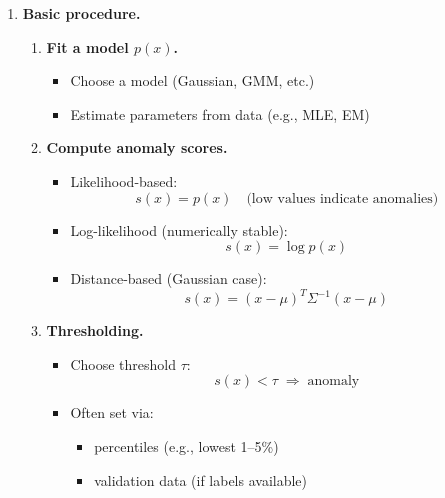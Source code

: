 \documentclass{article}
\begin{document}
\begin{enumerate}
\begin{itemize}
\begin{itemize}
\begin{itemize}
    \item Likelihood measures how well a model explains the data: for parameters $\theta$,
    \[
    L(\theta) = \prod_{i=1}^n p(x_i \mid \theta)
    \]

    \item Log-likelihood: same maximum as likelihood
    \[
    \ell(\theta) = \log L(\theta) = \sum_{i=1}^n \log p(x_i \mid \theta)
    \]

\end{itemize}

    \item \textbf{Key intuition:}
    \begin{itemize}
        \item E-step: assign points to clusters (softly)
        \item M-step: refit clusters using those assignments
    \end{itemize}
\end{itemize}
\end{itemize}

\item \textbf{Basic procedure.}

\begin{enumerate}
    \item \textbf{Fit a model \( p(x) \).}
    \begin{itemize}
        \item Choose a model (Gaussian, GMM, etc.)
        \item Estimate parameters from data (e.g., MLE, EM)
    \end{itemize}

    \item \textbf{Compute anomaly scores.}
    \begin{itemize}
        \item Likelihood-based:
        \[
        s(x) = p(x) \quad \text{(low values indicate anomalies)}
        \]
        \item Log-likelihood (numerically stable):
        \[
        s(x) = \log p(x)
        \]
        \item Distance-based (Gaussian case):
        \[
        s(x) = (x-\mu)^T \Sigma^{-1}(x-\mu)
        \]
    \end{itemize}

    \item \textbf{Thresholding.}
    \begin{itemize}
        \item Choose threshold \( \tau \):
        \[
        s(x) < \tau \;\Rightarrow\; \text{anomaly}
        \]
        \item Often set via:
        \begin{itemize}
            \item percentiles (e.g., lowest 1--5\%)
            \item validation data (if labels available)
        \end{itemize}
    \end{itemize}


\end{enumerate}
\end{enumerate}
\end{document}
